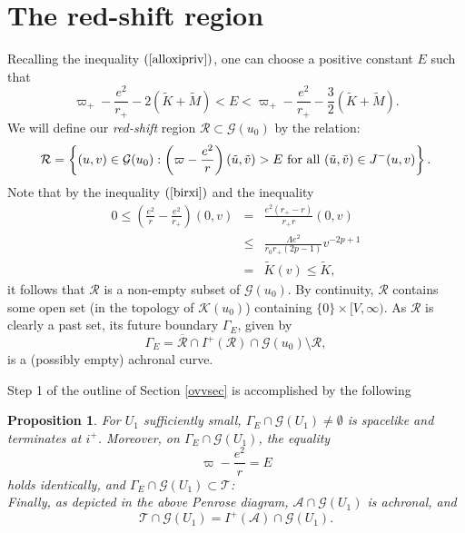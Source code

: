 \documentclass{article}
\newtheorem{proposition}[theorem]{Proposition}
\begin{document}
{\section{The red-shift region}
\label{rsrsec}
Recalling the inequality $(\ref{alloxipriv})$, one can 
choose a positive constant $E$ such that
\begin{equation}
\label{alloxi}
\varpi_+-\frac{e^2}{r_+}-2(\tilde{K}+\tilde{M})<
E<\varpi_+-\frac{e^2}{r_+}-\frac32(\tilde{K}+\tilde{M}).
\end{equation}
We will define our \emph{red-shift} region $\mathcal{R}\subset\mathcal{G}(u_0)$ 
by the relation:
\[
\mathcal{R}=\left\{(u,v)\in\mathcal{G}(u_0):\left(\varpi-\frac{e^2}r\right)(\tilde{u},
\tilde{v})>E
{\rm\ for\ all\ }(\tilde{u},\tilde{v})\in J^-(u,v)\right\}.
\]
Note that by the inequality $(\ref{birxi})$ and the inequality
\begin{eqnarray}
\label{ikixi}
\nonumber
0\le \left(\frac{e^2}{r}-\frac{e^2}{r_+}\right)(0,v)&=&
\frac{e^2(r_+-r)}{r_+r}(0,v)\\
&\le&\frac{\Lambda e^2}{r_0r_+(2p-1)}v^{-2p+1}\\
\nonumber
&=&\tilde{K}(v)\le \tilde{K},
\end{eqnarray}
it follows that
$\mathcal{R}$ is a non-empty subset of $\mathcal{G}(u_0)$.
By continuity,
$\mathcal{R}$ contains some open set (in the topology of $\mathcal{K}(u_0)$)
containing $\{0\}\times[V,\infty)$.
As $\mathcal{R}$ is clearly a past set, its future boundary
$\Gamma_{E}$, given by
\[
\Gamma_{E}=\overline{\mathcal{R}}\cap I^+(\mathcal{R})
\cap\mathcal{G}(u_0)\setminus\mathcal{R},
\]
is a (possibly empty) achronal curve.

Step 1 of the outline of Section \ref{ovvsec} is accomplished by the following 
\begin{proposition}
\label{prwtnprotasn}
For $U_1$ sufficiently small,
$\Gamma_{E}\cap\mathcal{G}(U_1)\ne\emptyset$ is spacelike and terminates 
at $i^+$. 
Moreover, on $\Gamma_{E}\cap\mathcal{G}(U_1)$, the equality
\[
\varpi-\frac{e^2}r=E
\]
holds
identically,
and
$\Gamma_{E}\cap\mathcal{G}(U_1)\subset\mathcal{T}$:
\[

\]
Finally, as depicted in the above Penrose diagram, $\mathcal{A}\cap\mathcal{G}(U_1)$
is achronal, and 
\[
\mathcal{T}\cap\mathcal{G}(U_1)=I^+(\mathcal{A})
\cap\mathcal{G}(U_1).
\]
\end{proposition}

}
\end{document}
